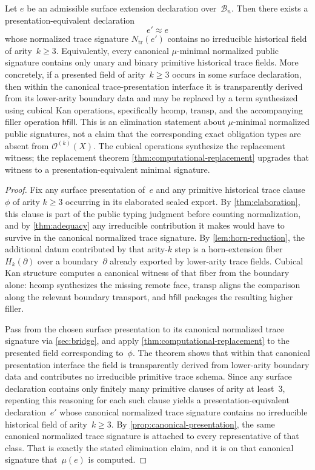\documentclass{lmcs}
\newcommand{\B}{\mathcal{B}}
\newcommand{\Ocal}{\mathcal{O}}
\newcommand{\hcomp}{\mathrm{hcomp}}
\newcommand{\transp}{\mathrm{transp}}
\begin{document}
\begin{thm}
\label{thm:higher-elim}
Let $e$ be an admissible surface extension declaration over~$\B_n$. Then there exists a presentation-equivalent declaration
\[
  e' \approx e
\]
whose normalized trace signature $N_{\mathrm{tr}}(e')$ contains no irreducible historical field of arity~$k \geq 3$. Equivalently, every canonical $\mu$-minimal normalized public signature contains only unary and binary primitive historical trace fields. More concretely, if a presented field of arity~$k \geq 3$ occurs in some surface declaration, then within the canonical trace-presentation interface it is transparently derived from its lower-arity boundary data and may be replaced by a term synthesized using cubical Kan operations, specifically $\hcomp$, $\transp$, and the accompanying filler operation $\mathsf{hfill}$.
This is an elimination statement about $\mu$-minimal normalized public signatures, not a claim that the corresponding exact obligation types are absent from $\Ocal^{(k)}(X)$. The cubical operations synthesize the replacement witness; the replacement theorem \autoref{thm:computational-replacement} upgrades that witness to a presentation-equivalent minimal signature.
\end{thm}

\begin{proof}
Fix any surface presentation of~$e$ and any primitive historical trace clause~$\phi$ of arity $k \geq 3$ occurring in its elaborated sealed export. By \autoref{thm:elaboration}, this clause is part of the public typing judgment before counting normalization, and by \autoref{thm:adequacy} any irreducible contribution it makes would have to survive in the canonical normalized trace signature. By \autoref{lem:horn-reduction}, the additional datum contributed by that arity-$k$ step is a horn-extension fiber $H_k(\partial)$ over a boundary~$\partial$ already exported by lower-arity trace fields. Cubical Kan structure computes a canonical witness of that fiber from the boundary alone: $\hcomp$ synthesizes the missing remote face, $\transp$ aligns the comparison along the relevant boundary transport, and $\mathsf{hfill}$ packages the resulting higher filler.

Pass from the chosen surface presentation to its canonical normalized trace signature via \autoref{sec:bridge}, and apply \autoref{thm:computational-replacement} to the presented field corresponding to~$\phi$. The theorem shows that within that canonical presentation interface the field is transparently derived from lower-arity boundary data and contributes no irreducible primitive trace schema. Since any surface declaration contains only finitely many primitive clauses of arity at least~$3$, repeating this reasoning for each such clause yields a presentation-equivalent declaration~$e'$ whose canonical normalized trace signature contains no irreducible historical field of arity~$k \geq 3$. By \autoref{prop:canonical-presentation}, the same canonical normalized trace signature is attached to every representative of that class. That is exactly the stated elimination claim, and it is on that canonical signature that~$\mu(e)$ is computed.
\end{proof}
\end{document}
